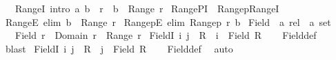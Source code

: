 \begin{isabellebody}
\ \ \ RangeI\ {\isacharbrackleft}{\kern0pt}intro{\isacharbrackright}{\kern0pt}{\isacharcolon}{\kern0pt}\ {\isachardoublequoteopen}{\isacharparenleft}{\kern0pt}a{\isacharcomma}{\kern0pt}\ b{\isacharparenright}{\kern0pt}\ {\isasymin}\ r\ {\isasymLongrightarrow}\ b\ {\isasymin}\ Range\ r{\isachardoublequoteclose}\isanewline
\isanewline
{}\isamarkupfalse%
\ RangePI\ {\isacharequal}{\kern0pt}\ Rangep{\isachardot}{\kern0pt}RangeI\isanewline
\isanewline
{}\isamarkupfalse%
\ RangeE\ {\isacharbrackleft}{\kern0pt}elim{\isacharbang}{\kern0pt}{\isacharbrackright}{\kern0pt}{\isacharcolon}{\kern0pt}\ {\isachardoublequoteopen}b\ {\isasymin}\ Range\ r{\isachardoublequoteclose}\isanewline
{}\isamarkupfalse%
\ RangepE\ {\isacharbrackleft}{\kern0pt}elim{\isacharbang}{\kern0pt}{\isacharbrackright}{\kern0pt}{\isacharcolon}{\kern0pt}\ {\isachardoublequoteopen}Rangep\ r\ b{\isachardoublequoteclose}\isanewline
\isanewline
{}\isamarkupfalse%
\ Field\ {\isacharcolon}{\kern0pt}{\isacharcolon}{\kern0pt}\ {\isachardoublequoteopen}{\isacharprime}{\kern0pt}a\ rel\ {\isasymRightarrow}\ {\isacharprime}{\kern0pt}a\ set{\isachardoublequoteclose}\isanewline
\ \ \ {\isachardoublequoteopen}Field\ r\ {\isacharequal}{\kern0pt}\ Domain\ r\ {\isasymunion}\ Range\ r{\isachardoublequoteclose}\isanewline
\isanewline
{}\isamarkupfalse%
\ FieldI{}{\isacharcolon}{\kern0pt}\ {\isachardoublequoteopen}{\isacharparenleft}{\kern0pt}i{\isacharcomma}{\kern0pt}\ j{\isacharparenright}{\kern0pt}\ {\isasymin}\ R\ {\isasymLongrightarrow}\ i\ {\isasymin}\ Field\ R{\isachardoublequoteclose}\isanewline
%
\isadelimproof
\ \ %
\endisadelimproof
%
\isatagproof
{}\isamarkupfalse%
\ Field{\isacharunderscore}{\kern0pt}def\ \isamarkupfalse%
\ blast%
\endisatagproof
{\isafoldproof}%
%
\isadelimproof
\isanewline
%
\endisadelimproof
\isanewline
{}\isamarkupfalse%
\ FieldI{}{\isacharcolon}{\kern0pt}\ {\isachardoublequoteopen}{\isacharparenleft}{\kern0pt}i{\isacharcomma}{\kern0pt}\ j{\isacharparenright}{\kern0pt}\ {\isasymin}\ R\ {\isasymLongrightarrow}\ j\ {\isasymin}\ Field\ R{\isachardoublequoteclose}\isanewline
%
\isadelimproof
\ \ %
\endisadelimproof
%
\isatagproof
{}\isamarkupfalse%
\ Field{\isacharunderscore}{\kern0pt}def\ \isamarkupfalse%
\ auto%
\endisatagproof
{\isafoldproof}%
%
\isadelimproof
\isanewline
%
\endisadelimproof

\end{isabellebody}

